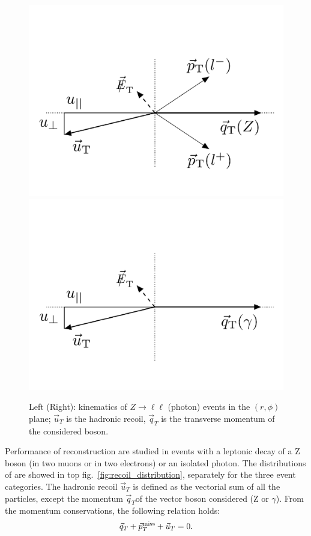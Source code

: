 \begin{figure}[!htb]
  \centering
    \includegraphics[width=.35\textwidth]{figures/MetPlots/u_comp_Z.png}%
    \includegraphics[width=.35\textwidth]{figures/MetPlots/u_comp_gamma.png}

  \caption{Left (Right): kinematics of $Z \rightarrow \ell \ell$ (photon) events in the $(r, \phi)$ plane; $\vec{u}_T$ is the hadronic recoil, $\vec{q}_T$ is the transverse momentum of the considered boson.}
  \label{fig:recoil}
\end{figure}

\noindent Performance of \MET reconstruction are studied in events with a leptonic decay of a Z boson (in two muons or in two electrons) or an isolated photon. The distributions of \MET are showed in top fig.~\ref{fig:recoil_distribution}, separately for the three event categories. The hadronic recoil $\vec{u}_T$ is defined as the vectorial sum of all the particles, except the momentum $\vec{q}_T$of the vector boson considered (Z or $\gamma$). From the momentum conservations, the following relation holds:
\begin{equation}
\vec{q}_T + \vec{p}_T^{\text{miss}} + \vec{u}_T = 0.
\label{eq:recoil_def}
\end{equation}


